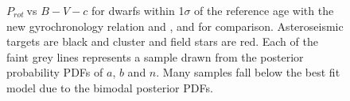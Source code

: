 \documentclass[useAMS, usenatbib]{mn2e}
\newcommand{\prot}{$P_{rot}~$}
\begin{document}
\begin{figure}
\begin{center}
{        }
    \end{center}
    \caption{ \prot vs $B-V-c$ for dwarfs within 1$\sigma$ of the
reference age with the new gyrochronology relation and \citet{Barnes2007}, and
\citet{Mamajek2008} for comparison.
Asteroseismic targets are black and
cluster and field stars are red.
Each of the faint grey lines represents a
sample drawn from the posterior probability PDFs of $a$, $b$ and $n$.
Many samples fall below the best fit model due to the bimodal posterior PDFs.
\label{fig:subfigures2}}
\end{figure}
\end{document}

